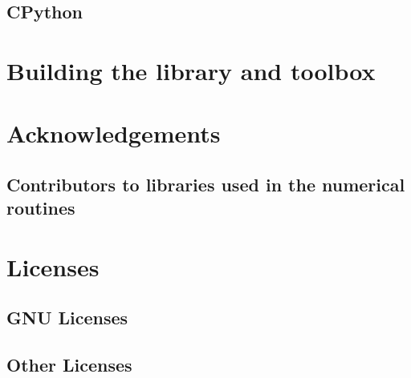 \documentclass[12pt,a4paper,openany]{book}
\begin{document}
\section{CPython}

\chapter{Building the library and toolbox}

\chapter{Acknowledgements}

\section{Contributors to libraries used in the numerical routines}

\chapter{Licenses}

\section{GNU Licenses}

\section{Other Licenses}

\chapter{\tocbibname }
\end{document}
